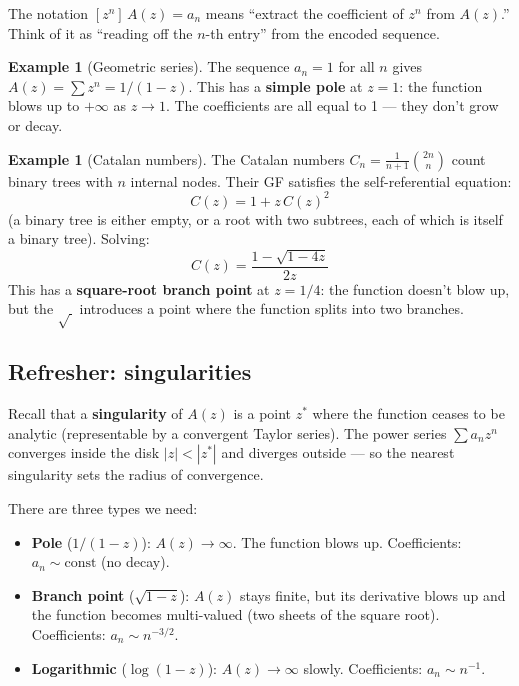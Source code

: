 \documentclass[11pt,a4paper]{article}
\theoremstyle{definition}
\newtheorem{example}[theorem]{Example}
\begin{document}
The notation $[z^n]\,A(z) = a_n$ means ``extract the coefficient of $z^n$
from $A(z)$.'' Think of it as ``reading off the $n$-th entry'' from the
encoded sequence.

\begin{example}[Geometric series]
The sequence $a_n = 1$ for all $n$ gives $A(z) = \sum z^n = 1/(1-z)$.
This has a \textbf{simple pole} at $z = 1$: the function blows up to
$+\infty$ as $z \to 1$. The coefficients are all equal to 1 --- they
don't grow or decay.
\end{example}

\begin{example}[Catalan numbers]
The Catalan numbers $C_n = \frac{1}{n+1}\binom{2n}{n}$ count binary trees
with $n$ internal nodes. Their GF satisfies the self-referential equation:
\[
C(z) = 1 + z\, C(z)^2
\]
(a binary tree is either empty, or a root with two subtrees, each of which
is itself a binary tree). Solving:
\[
C(z) = \frac{1 - \sqrt{1 - 4z}}{2z}
\]
This has a \textbf{square-root branch point} at $z = 1/4$: the function
doesn't blow up, but the $\sqrt{\,}$ introduces a point where the function
splits into two branches.
\end{example}

\subsection{Refresher: singularities}

Recall that a \textbf{singularity} of $A(z)$ is a point $z^*$ where the
function ceases to be analytic (representable by a convergent Taylor
series). The power series $\sum a_n z^n$ converges inside the disk
$|z| < |z^*|$ and diverges outside --- so the nearest singularity sets
the radius of convergence.

There are three types we need:
\begin{itemize}
\item \textbf{Pole} ($1/(1{-}z)$): $A(z) \to \infty$. The function
      blows up. Coefficients: $a_n \sim \mathrm{const}$ (no decay).
\item \textbf{Branch point} ($\sqrt{1{-}z}$): $A(z)$ stays finite, but
      its derivative blows up and the function becomes multi-valued
      (two sheets of the square root). Coefficients: $a_n \sim n^{-3/2}$.
\item \textbf{Logarithmic} ($\log(1{-}z)$): $A(z) \to \infty$ slowly.
      Coefficients: $a_n \sim n^{-1}$.
\end{itemize}
\end{document}
